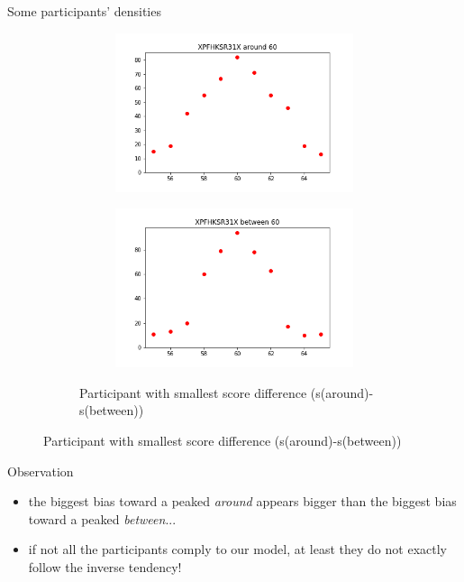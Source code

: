 \documentclass[xcolor=table, hyperref={pdfpagelabels=false}]{beamer}
\begin{document}
\begin{frame}{Some participants' densities}
\begin{minipage}{.6\textwidth}
\begin{figure}[H]
\begin{subfigure}{\textwidth}
\begin{subfigure}{.47\textwidth}
			\includegraphics[width=\textwidth]{./images/XPFHKSR31X_around_60.png}
		\end{subfigure}
		\begin{subfigure}{.47\textwidth}
			\includegraphics[width=\textwidth]{./images/XPFHKSR31X_between_60.png}
		\end{subfigure}
		\caption{Participant with smallest score difference (s(around)-s(between))}
	\end{subfigure}
\end{figure}
\end{minipage}\quad
\begin{minipage}{.35\textwidth}
	\begin{block}{Observation}
		\begin{itemize}
			\item the biggest bias toward a peaked \textit{around} appears bigger than the biggest bias toward a peaked \textit{between}...
			\item if not all the participants comply to our model, at least they do not exactly follow the inverse tendency!
		\end{itemize}
	\end{block}
\end{minipage}
\end{frame}
\end{document}

